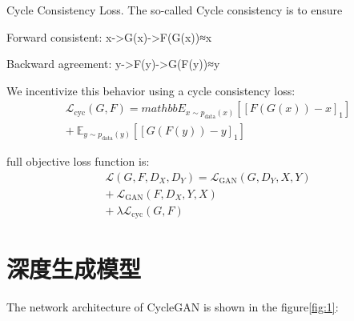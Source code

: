   Cycle Consistency Loss. The so-called Cycle consistency is to ensure
  
  Forward consistent: x->G(x)->F(G(x))≈x
  
  Backward agreement: y->F(y)->G(F(y))≈y

  We incentivize this behavior using a cycle consistency loss:
 \begin{align}
   \mathcal{L}_{\text{cyc}}(G, F) =  mathbb{E}_{x\sim p_{\text{data}}(x)} [[{F(G(x))-x}]_1] \nonumber \\ 
   + \ \mathbb{E}_{y\sim p_{\text{data}}(y)}[[{G(F(y))-y}]_1]
 \end{align}

 full objective loss function is:
 \begin{align}
  \mathcal{L}(G,F,D_X,D_Y) = \mathcal{L}_{\text{GAN}}(G,D_Y,X,Y) \nonumber \\
  +\ \mathcal{L}_{\text{GAN}}(F,D_X,Y,X) \nonumber \\
  +\  \lambda \mathcal{L}_{\text{cyc}}(G, F)
 \end{align}




\section{\heiti 深度生成模型}
The network architecture of CycleGAN is shown in the figure\ref{fig:1}:

